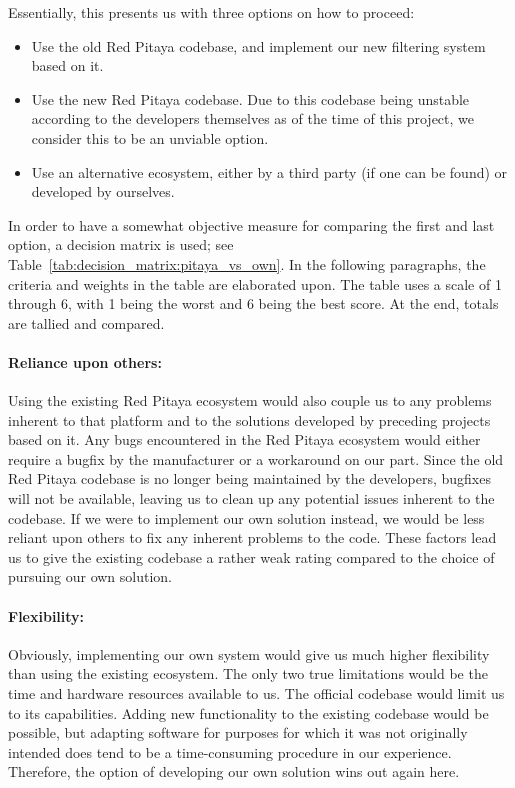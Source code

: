 Essentially, this presents us with three options on how to proceed:
\begin{itemize}
    \item
        Use  the old  Red Pitaya  codebase,  and implement  our new  filtering
        system based on it.
    \item
        Use the new  Red Pitaya codebase. Due to this  codebase being unstable
        according to the developers themselves as of the time of this project,
        we consider this to be an unviable option.
    \item
        Use an alternative  ecosystem, either by a third party  (if one can be
        found) or developed by ourselves.
\end{itemize}
In   order   to   have   a    somewhat   objective   measure   for   comparing
the   first   and   last   option,    a   decision   matrix   is   used;   see
Table~\ref{tab:decision_matrix:pitaya_vs_own}. In  the  following  paragraphs,
the criteria  and weights in the  table are elaborated upon. The  table uses a
scale of  \num{1} through \num{6},  with \num{1}  being the worst  and \num{6}
being the best score. At the end, totals are tallied and compared.

\paragraph{Reliance  upon others:} Using  the  existing  Red Pitaya  ecosystem
would also  couple us  to any problems  inherent to that  platform and  to the
solutions developed by preceding projects based on it. Any bugs encountered in
the Red Pitaya ecosystem would either  require a bugfix by the manufacturer or
a workaround on our part. Since the old Red Pitaya codebase is no longer being
maintained by  the developers, bugfixes will  not be available, leaving  us to
clean  up  any potential  issues  inherent  to  the  codebase. If we  were  to
implement our  own solution instead, we  would be less reliant  upon others to
fix  any inherent  problems to  the code. These  factors lead  us to  give the
existing codebase a rather weak rating  compared to the choice of pursuing our
own solution.

\paragraph{Flexibility:} Obviously, implementing our own  system would give us
much higher flexibility  than using the existing ecosystem. The  only two true
limitations would  be the  time and  hardware resources  available to  us. The
official codebase would limit us to its capabilities. Adding new functionality
to the existing codebase would be possible, but adapting software for purposes
for which  it was  not originally  intended does tend  to be  a time-consuming
procedure  in our  experience.  Therefore,  the option  of developing  our own
solution wins out again here.

